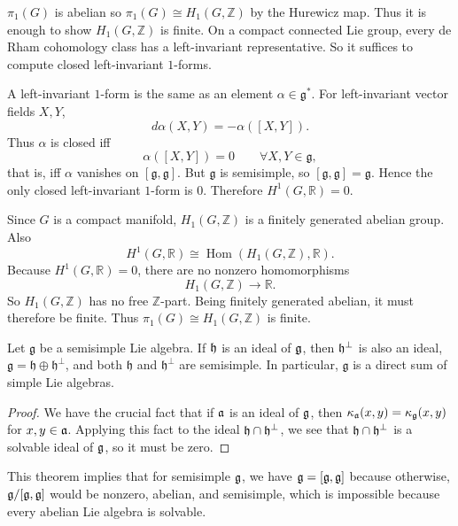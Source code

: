 \documentclass[12pt]{article}
\begin{document}
\begin{solution}
    $\pi_1(G)$ is abelian so $\pi_1(G)\cong H_1(G,\mathbb{Z})$ by the Hurewicz map. Thus it is enough to show $H_1(G,\mathbb{Z})$ is finite. On a compact connected Lie group, every de Rham cohomology class has a left-invariant representative. So it suffices to compute closed left-invariant $1$-forms.

    A left-invariant $1$-form is the same as an element $\alpha\in \mathfrak{g}^*$. For left-invariant vector fields $X,Y$,
    $$d\alpha(X,Y)=-\alpha([X,Y]).$$
    Thus $\alpha$ is closed iff
    $$\alpha([X,Y])=0 \qquad \forall X,Y\in\mathfrak{g},$$
    that is, iff $\alpha$ vanishes on $[\mathfrak{g},\mathfrak{g}]$. But $\mathfrak{g}$ is semisimple, so $[\mathfrak{g},\mathfrak{g}]=\mathfrak{g}$.
    Hence the only closed left-invariant $1$-form is $0$. Therefore $H^1(G,\mathbb{R})=0$.

    Since $G$ is a compact manifold, $H_1(G,\mathbb{Z})$ is a finitely generated abelian group. Also
    $$H^1(G,\mathbb{R})\cong \operatorname{Hom}(H_1(G,\mathbb{Z}),\mathbb{R}).$$
    Because $H^1(G,\mathbb{R})=0$, there are no nonzero homomorphisms
    $$H_1(G,\mathbb{Z})\to \mathbb{R}.$$
    So $H_1(G,\mathbb{Z})$ has no free $\mathbb{Z}$-part. Being finitely generated abelian, it must therefore be finite. Thus $\pi_1(G)\cong H_1(G,\mathbb{Z})$ is finite.
\end{solution}

\begin{theorem}
    Let $\mathfrak g$ be a semisimple Lie algebra. If $\mathfrak{h}$ is an ideal of $\mathfrak{g}$, then $\mathfrak{h}^\perp$ is also an ideal, $\mathfrak g = \mathfrak h \oplus \mathfrak h^\perp$, and both $\mathfrak h$ and $\mathfrak h^\perp$ are semisimple. In particular, $\mathfrak g$ is a direct sum of simple Lie algebras.
\end{theorem}

\begin{proof}
    We have the crucial fact that if $\mathfrak{a}$ is an ideal of $\mathfrak{g}$, then $\kappa_{\mathfrak{a}}(x,y) = \kappa_{\mathfrak{g}}(x,y)$ for $x,y \in \mathfrak{a}$. Applying this fact to the ideal $\mathfrak{h} \cap \mathfrak{h}^\perp$, we see that $\mathfrak{h} \cap \mathfrak{h}^\perp$ is a solvable ideal of $\mathfrak{g}$, so it must be zero.
\end{proof}

This theorem implies that for semisimple $\mathfrak{g}$, we have $\mathfrak{g} = [\mathfrak{g}, \mathfrak{g}]$ because otherwise, $\mathfrak{g} / [\mathfrak{g}, \mathfrak{g}]$ would be nonzero, abelian, and semisimple, which is impossible because every abelian Lie algebra is solvable.
\end{document}
